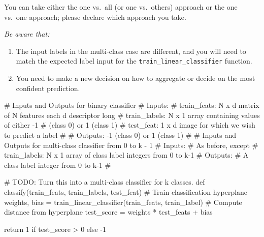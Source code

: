You can take either the one vs.~all (or one vs.~others) approach or the one vs.~one approach; please declare which approach you take.


\emph{Be aware that:}
\begin{enumerate}
    \item The input labels in the multi-class case are different, and you will need to match the expected label input for the \texttt{train\_linear\_classifier} function.
    \item You need to make a new decision on how to aggregate or decide on the most confident prediction.
\end{enumerate}


\pagebreak
\begin{tcolorbox}[enhanced jigsaw,breakable,pad at break*=1mm,colback=white!5!white,colframe=green!75!black,height fixed for=all]
\begin{python}
# Inputs and Outputs for binary classifier
# Inputs:
#   train_feats: N x d matrix of N features each d descriptor long
#   train_labels: N x 1 array containing values of either -1 
#               (class 0) or 1 (class 1)
#   test_feat: 1 x d image for which we wish to predict a label
#
# Outputs: -1 (class 0) or 1 (class 1)
#
# Inputs and Outputs for multi-class classifier from 0 to k - 1
# Inputs:
#    As before, except
#    train_labels: N x 1 array of class label integers from 0 to k-1
# Outputs:
#    A class label integer from 0 to k-1
#

# TODO: Turn this into a multi-class classifier for k classes.
def classify(train_feats, train_labels, test_feat)
    # Train classification hyperplane
    weights, bias = train_linear_classifier(train_feats, train_label)
    # Compute distance from hyperplane
    test_score = weights * test_feats + bias

    return 1 if test_score > 0 else -1
    
\end{python}


\end{tcolorbox}

